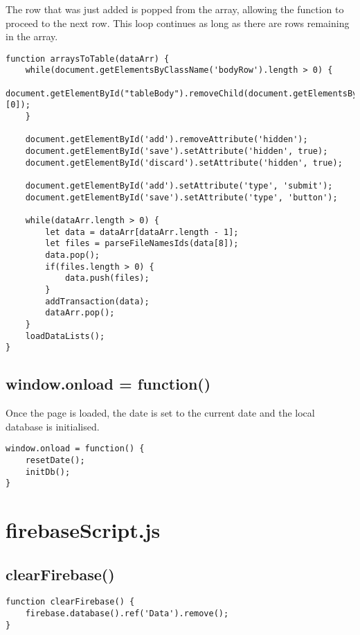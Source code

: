 \documentclass[letterpaper]{article}
\begin{document}
The row that was just added is popped from the array, allowing the function to proceed to the next row.
This loop continues as long as there are rows remaining in the array.

\begin{lstlisting}[firstnumber=765]
function arraysToTable(dataArr) {
    while(document.getElementsByClassName('bodyRow').length > 0) {
        document.getElementById("tableBody").removeChild(document.getElementsByClassName('bodyRow')[0]);
    }

    document.getElementById('add').removeAttribute('hidden');
    document.getElementById('save').setAttribute('hidden', true);
    document.getElementById('discard').setAttribute('hidden', true);

    document.getElementById('add').setAttribute('type', 'submit');
    document.getElementById('save').setAttribute('type', 'button');

    while(dataArr.length > 0) {
        let data = dataArr[dataArr.length - 1];
        let files = parseFileNamesIds(data[8]);
        data.pop();
        if(files.length > 0) {
            data.push(files);
        }
        addTransaction(data);
        dataArr.pop();
    }
    loadDataLists();
}
\end{lstlisting}

\subsection{window.onload = function()}

Once the page is loaded, the date is set to the current date and the local database is initialised.

\begin{lstlisting}[firstnumber=790]
window.onload = function() {
    resetDate();
    initDb();
}
\end{lstlisting}

\newpage

\section{firebaseScript.js}

\subsection{clearFirebase()}

\begin{lstlisting}[firstnumber=1]
function clearFirebase() {
    firebase.database().ref('Data').remove();
}
\end{lstlisting}
\end{document}
